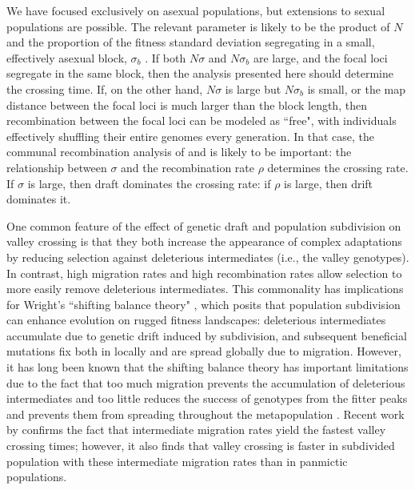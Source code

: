 \documentclass[rmp]{revtex4}
\begin{document}
\begin{spacing}{1.5}
We have focused exclusively on asexual populations, but extensions to sexual populations are possible.
The relevant parameter is likely to be the product of $N$ and the proportion of the fitness standard deviation segregating in a small, effectively asexual block, $\sigma_b$ \citep{neher_kessinger_2013}.
If both $N\sigma$ and $N\sigma_b$ are large, and the focal loci segregate in the same block, then the analysis presented here should determine the crossing time.
If, on the other hand, $N\sigma$ is large but $N\sigma_b$ is small, or the map distance between the focal loci is much larger than the block length, then recombination between the focal loci can be modeled as ``free", with individuals effectively shuffling their entire genomes every generation.
In that case, the communal recombination analysis of \citet{neher_shraiman_2011} and \citet{neher_shraiman_2010} is likely to be important: the relationship between $\sigma$ and the recombination rate $\rho$ determines the crossing rate.
If $\sigma$ is large, then draft dominates the crossing rate: if $\rho$ is large, then drift dominates it.

One common feature of the effect of genetic draft and population subdivision on valley crossing is that they both increase the appearance of complex adaptations by reducing selection against deleterious intermediates (i.e., the valley genotypes).
In contrast, high migration rates and high recombination rates \citep{neher_shraiman_2009} allow selection to more easily remove deleterious intermediates.
This commonality has implications for Wright's ``shifting balance theory" \citep{Wright:1932}, which posits that population subdivision can enhance evolution on rugged fitness landscapes: deleterious intermediates accumulate due to genetic drift induced by subdivision, and subsequent beneficial mutations fix both in locally and are spread globally due to migration.
However, it has long been known that the shifting balance theory has important limitations due to the fact that too much migration prevents the accumulation of deleterious intermediates and too little reduces the success of genotypes from the fitter peaks and prevents them from spreading throughout the metapopulation \citep{coyne_barton_turelli_2000,Van-Cleve:Weissman:2015}.
Recent work by \citet{Bitbol:Schwab:2014} confirms the fact that intermediate migration rates yield the fastest valley crossing times; however, it also finds that valley crossing is faster in subdivided population with these intermediate migration rates than in panmictic populations.


\end{spacing}
\end{document}
